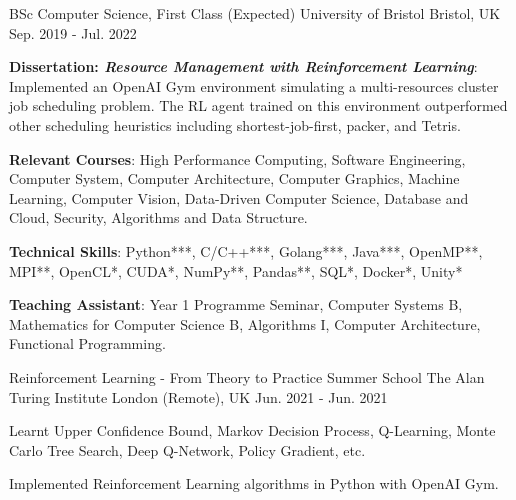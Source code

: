 

\begin{cventries}

  \cventry
    {BSc Computer Science, First Class (Expected)} %
    {University of Bristol} %
    {Bristol, UK} %
    {Sep. 2019 - Jul. 2022} %
    {
      \begin{cvitems} %
      \item {\textbf{Dissertation: \textit{Resource Management with Reinforcement Learning}}: Implemented an OpenAI Gym environment simulating a multi-resources cluster job scheduling problem. The RL agent trained on this environment outperformed other scheduling heuristics including shortest-job-first, packer, and Tetris.}
        \item {\textbf{Relevant Courses}: High Performance Computing, Software Engineering, Computer System, Computer Architecture, Computer Graphics, Machine Learning, Computer Vision, Data-Driven Computer Science, Database and Cloud, Security, Algorithms and Data Structure.}
        \item {\textbf{Technical Skills}: Python***, C/C++***, Golang***, Java***, OpenMP**, MPI**, OpenCL*, CUDA*, NumPy**, Pandas**, SQL*, Docker*, Unity*}
        \item {\textbf{Teaching Assistant}: Year 1 Programme Seminar, Computer Systems B, Mathematics for Computer Science B, Algorithms I, Computer Architecture, Functional Programming.}
      \end{cvitems}
    }
    
  \cventry
    {Reinforcement Learning - From Theory to Practice Summer School} %
    {The Alan Turing Institute} %
    {London (Remote), UK} %
    {Jun. 2021 - Jun. 2021} %
    {
      \begin{cvitems} %
        \item {Learnt Upper Confidence Bound, Markov Decision Process, Q-Learning, Monte Carlo Tree Search, Deep Q-Network, Policy Gradient, etc.}
        \item {Implemented Reinforcement Learning algorithms in Python with OpenAI Gym.}
      \end{cvitems}
    }

\end{cventries}
